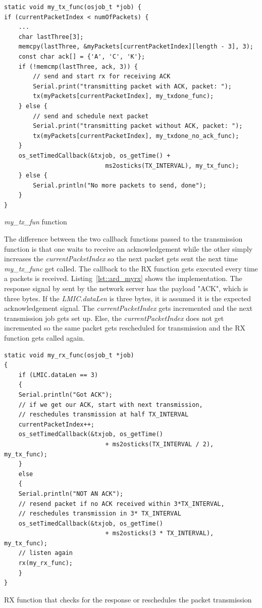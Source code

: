 \begin{listing}[h]
    \begin{verbatim}
static void my_tx_func(osjob_t *job) {
if (currentPacketIndex < numOfPackets) {
    ...
    char lastThree[3];
    memcpy(lastThree, &myPackets[currentPacketIndex][length - 3], 3);
    const char ack[] = {'A', 'C', 'K'};
    if (!memcmp(lastThree, ack, 3)) {
        // send and start rx for receiving ACK
        Serial.print("transmitting packet with ACK, packet: ");
        tx(myPackets[currentPacketIndex], my_txdone_func);
    } else {
        // send and schedule next packet
        Serial.print("transmitting packet without ACK, packet: ");
        tx(myPackets[currentPacketIndex], my_txdone_no_ack_func);
    }
    os_setTimedCallback(&txjob, os_getTime() +
                            ms2osticks(TX_INTERVAL), my_tx_func);
    } else {
        Serial.println("No more packets to send, done");
    }
}
    \end{verbatim}
    \caption{\emph{my\_tx\_fun} function}
    \label{lst::ard_mytx}
\end{listing}

The difference between the two callback functions passed to the transmission function is that one
waits to receive an acknowledgement while the other simply increases the \emph{currentPacketIndex}
so the next packet gets sent the next time \emph{my\_tx\_func} get called.
The callback to the RX function gets executed every time a packets is received.
Listing~\ref{lst::ard_myrx} shows the implementation. The response signal by sent
by the network server has the payload "ACK", which is three bytes. 
If the \emph{LMIC.dataLen} is three bytes, it is assumed it is the expected acknowledgement signal.
The \emph{currentPacketIndex} gets incremented and the next transmission job gets set up.
Else, the \emph{currentPacketIndex} does not get incremented so the same packet gets rescheduled 
for transmission and the RX function gets called again.


\begin{listing}[h]
    \begin{verbatim}
static void my_rx_func(osjob_t *job)
{
    if (LMIC.dataLen == 3)
    {
    Serial.println("Got ACK");
    // if we get our ACK, start with next transmission, 
    // reschedules transmission at half TX_INTERVAL
    currentPacketIndex++;
    os_setTimedCallback(&txjob, os_getTime()
                            + ms2osticks(TX_INTERVAL / 2), my_tx_func);
    }
    else
    {
    Serial.println("NOT AN ACK");
    // resend packet if no ACK received within 3*TX_INTERVAL,
    // reschedules transmission in 3* TX_INTERVAL
    os_setTimedCallback(&txjob, os_getTime() 
                            + ms2osticks(3 * TX_INTERVAL), my_tx_func);
    // listen again
    rx(my_rx_func);
    }
}
    \end{verbatim}
    \caption{RX function that checks for the response or reschedules the packet transmission}
    \label{lst::ard_myrx}
\end{listing}

